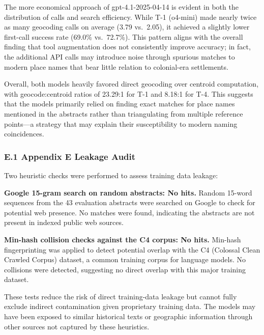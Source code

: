 The more economical approach of gpt-4.1-2025-04-14 is evident in both
the distribution of calls and search efficiency. While T-1 (o4-mini)
made nearly twice as many geocoding calls on average (3.79 vs.~2.05), it
achieved a slightly lower first-call success rate (69.0\% vs.~72.7\%).
This pattern aligns with the overall finding that tool augmentation does
not consistently improve accuracy; in fact, the additional API calls may
introduce noise through spurious matches to modern place names that bear
little relation to colonial-era settlements.

Overall, both models heavily favored direct geocoding over centroid
computation, with geocode:centroid ratios of 23.29:1 for T-1 and 8.18:1
for T-4. This suggests that the models primarily relied on finding exact
matches for place names mentioned in the abstracts rather than
triangulating from multiple reference points---a strategy that may
explain their susceptibility to modern naming coincidences.

\subsubsection{E.1 Appendix E Leakage
Audit}\label{e.1-appendix-e-leakage-audit}

Two heuristic checks were performed to assess training data leakage:

\textbf{Google 15-gram search on random abstracts: No hits.} Random
15-word sequences from the 43 evaluation abstracts were searched on
Google to check for potential web presence. No matches were found,
indicating the abstracts are not present in indexed public web sources.

\textbf{Min-hash collision checks against the C4 corpus: No hits.}
Min-hash fingerprinting was applied to detect potential overlap with the
C4 (Colossal Clean Crawled Corpus) dataset, a common training corpus for
language models. No collisions were detected, suggesting no direct
overlap with this major training dataset.

These tests reduce the risk of direct training-data leakage but cannot
fully exclude indirect contamination given proprietary training data.
The models may have been exposed to similar historical texts or
geographic information through other sources not captured by these
heuristics.
